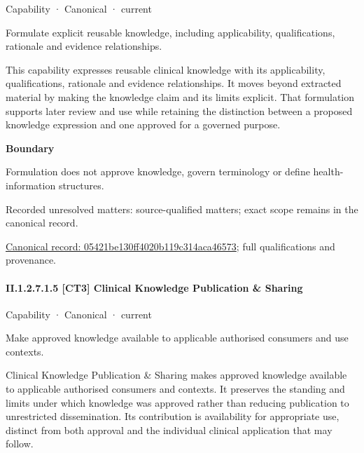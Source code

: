 \label{element:05421be130ff4020b119c314aca46573}
{\small Capability · Canonical · current}\par

Formulate explicit reusable knowledge, including applicability, qualifications, rationale and evidence relationships.



This capability expresses reusable clinical knowledge with its applicability, qualifications, rationale and evidence relationships. It moves beyond extracted material by making the knowledge claim and its limits explicit. That formulation supports later review and use while retaining the distinction between a proposed knowledge expression and one approved for a governed purpose.



\textbf{Boundary}



Formulation does not approve knowledge, govern terminology or define health-information structures.


{\small Recorded unresolved matters: source-qualified matters; exact scope remains in the canonical record.}\par
{\footnotesize \href{../../../../../../../continuum/strategy/capability/05421be130ff4020b119c314aca46573.md}{Canonical record: 05421be130ff4020b119c314aca46573}; full qualifications and provenance.}\par
\paragraph*{II.1.2.7.1.5 [CT3] Clinical Knowledge Publication \& Sharing}
\label{navigation:II.1.2.7.1.5}

\label{element:962a5e3048424ff7b2413e21a8e51f53}
{\small Capability · Canonical · current}\par

Make approved knowledge available to applicable authorised consumers and use contexts.



Clinical Knowledge Publication \& Sharing makes approved knowledge available to applicable authorised consumers and contexts. It preserves the standing and limits under which knowledge was approved rather than reducing publication to unrestricted dissemination. Its contribution is availability for appropriate use, distinct from both approval and the individual clinical application that may follow.



